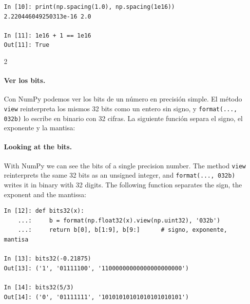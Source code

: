 \begin{verbatim}
In [10]: print(np.spacing(1.0), np.spacing(1e16))
2.220446049250313e-16 2.0

In [11]: 1e16 + 1 == 1e16
Out[11]: True
\end{verbatim}
\begin{paracol}{2}
\paragraph{Ver los bits.} Con NumPy podemos ver los bits de un número en precisión simple. El método \texttt{view} reinterpreta los mismos 32 bits como un entero sin signo, y \texttt{format(..., \textquotesingle{}032b\textquotesingle{})} lo escribe en binario con 32 cifras. La siguiente función separa el signo, el exponente y la mantisa:
\switchcolumn
\paragraph{Looking at the bits.} With NumPy we can see the bits of a single precision number. The method \texttt{view} reinterprets the same 32 bits as an unsigned integer, and \texttt{format(..., \textquotesingle{}032b\textquotesingle{})} writes it in binary with 32 digits. The following function separates the sign, the exponent and the mantissa:
\end{paracol}
\begin{verbatim}
In [12]: def bits32(x):
    ...:     b = format(np.float32(x).view(np.uint32), '032b')
    ...:     return b[0], b[1:9], b[9:]      # signo, exponente, mantisa

In [13]: bits32(-0.21875)
Out[13]: ('1', '01111100', '11000000000000000000000')

In [14]: bits32(5/3)
Out[14]: ('0', '01111111', '10101010101010101010101')
\end{verbatim}
